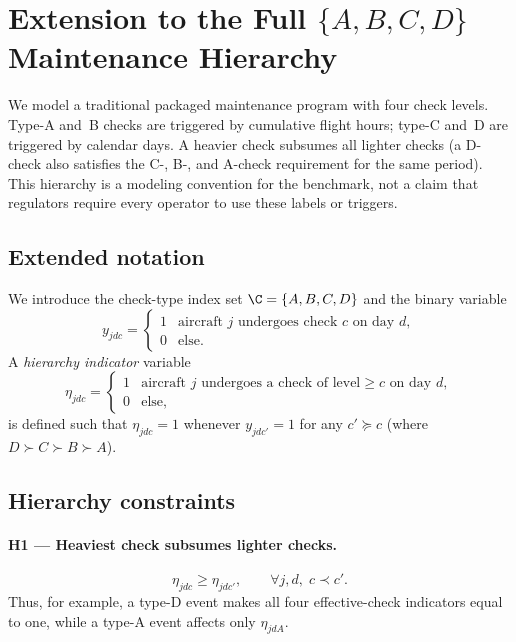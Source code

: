 \section{Extension to the Full \texorpdfstring{$\{A, B, C, D\}$}{ABCD}
         Maintenance Hierarchy}
\label{sec:hierarchy}

We model a traditional packaged maintenance program with four check levels.
Type-A and~B checks are triggered by cumulative flight hours; type-C and~D are
triggered by calendar days. A heavier check subsumes all lighter checks (a
D-check also satisfies the C-, B-, and A-check requirement for the same
period). This hierarchy is a modeling convention for the benchmark, not a
claim that regulators require every operator to use these labels or triggers.

\subsection{Extended notation}

We introduce the check-type index set $\C = \{A, B, C, D\}$ and the binary
variable
\begin{equation}
  y_{jdc} = \begin{cases} 1 & \text{aircraft } j \text{ undergoes check }
    c \text{ on day } d, \\ 0 & \text{else.} \end{cases}
\end{equation}
A \emph{hierarchy indicator} variable
\begin{equation}
  \eta_{jdc} = \begin{cases} 1 & \text{aircraft } j \text{ undergoes a check
    of level} \ge c \text{ on day } d, \\ 0 & \text{else,} \end{cases}
\end{equation}
is defined such that $\eta_{jdc} = 1$ whenever $y_{jdc'} = 1$ for any $c'
\succeq c$ (where $D \succ C \succ B \succ A$).

\subsection{Hierarchy constraints}

\paragraph{H1 — Heaviest check subsumes lighter checks.}
\begin{equation}\label{eq:hier1}
  \eta_{jdc} \ge \eta_{jdc'}, \qquad \forall j,d,\; c \prec c'.
\end{equation}
Thus, for example, a type-D event makes all four effective-check indicators
equal to one, while a type-A event affects only $\eta_{jdA}$.


